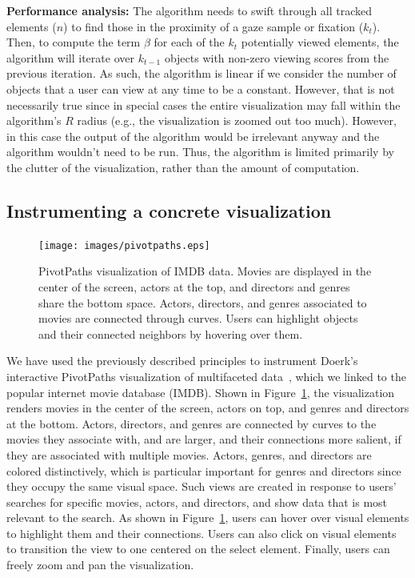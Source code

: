 {\bf Performance analysis:} The algorithm needs to swift through all tracked elements ($n$) to find those in the proximity of a gaze sample or fixation ($k_t$). Then, to compute the term $\beta$ for each of the $k_t$ potentially viewed elements, the algorithm will iterate over $k_{t-1}$ objects with non-zero viewing scores from the previous iteration. As such, the algorithm is linear if we consider the number of objects that a user can view at any time to be a constant. However, that is not necessarily true since in special cases the entire visualization may fall within the algorithm's $R$ radius (e.g., the visualization is zoomed out too much). However, in this case the output of the algorithm would be irrelevant anyway and the algorithm wouldn't need to be run. Thus, the algorithm is limited primarily by the clutter of the visualization, rather than the amount of computation. 


\subsection{Instrumenting a concrete visualization}
\label{sec:InstrumentingVisualization}

\begin{figure}[htb]
  \centering
  \texttt{[image: images/pivotpaths.eps]}
  \caption{PivotPaths visualization of IMDB data. Movies are displayed in the center of the screen, actors at the top, and directors and genres share the bottom space. Actors, directors, and genres associated to movies are connected through curves. Users can highlight objects and their connected neighbors by hovering over them.}
	\label{fig:pivotpaths}
\end{figure}
We have used the previously described principles to instrument Doerk's interactive PivotPaths visualization of multifaceted data~\cite{dork2012pivotpaths}, which we linked to the popular internet movie database (IMDB). Shown in Figure~\ref{fig:pivotpaths}, the visualization renders movies in the center of the screen, actors on top, and genres and directors at the bottom. Actors, directors, and genres are connected by curves to the movies they associate with, and are larger, and their connections more salient, if they are associated with multiple movies. Actors, genres, and directors are colored distinctively, which is particular important for genres and directors since they occupy the same visual space. Such views are created in response to users' searches for specific movies, actors, and directors, and show data that is most relevant to the search. As shown in Figure~\ref{fig:pivotpaths}, users can hover over visual elements to highlight them and their connections. Users can also click on visual elements to transition the view to one centered on the select element. Finally, users can freely zoom and pan the visualization. 

